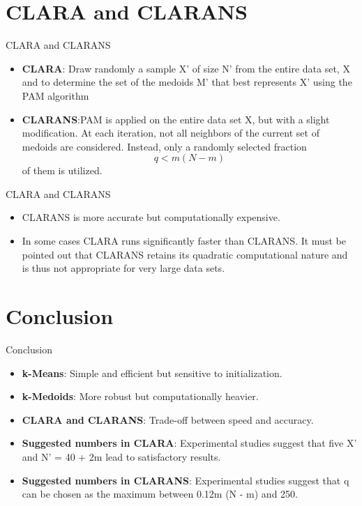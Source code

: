 \documentclass{beamer}
\begin{document}
\section{CLARA and CLARANS}
\begin{frame}{CLARA and CLARANS}
    \begin{itemize}
        \item \textbf{CLARA}: Draw randomly a sample X'
 of size N' from the entire data set, X and to determine the set of the medoids M' that best represents X' using the PAM algorithm
        \item \textbf{CLARANS}:PAM is applied on the entire data set X, but with a slight modification. At each iteration, not all neighbors of the current set of medoids are considered. Instead, only a randomly selected fraction 
        \[
        q < m(N - m)
        \]
        of them is utilized.
        
    \end{itemize}
\end{frame}
\begin{frame}{CLARA and CLARANS}
    \begin{itemize}
        \item CLARANS is more accurate but computationally expensive.
        \item In some cases CLARA runs significantly faster than CLARANS. It must be pointed out that CLARANS retains its quadratic computational nature and is thus not appropriate for very large data sets.
    \end{itemize}
\end{frame}

\section{Conclusion}
\begin{frame}{Conclusion}
    \begin{itemize}
        \item \textbf{k-Means}: Simple and efficient but sensitive to initialization.
        \item \textbf{k-Medoids}: More robust but computationally heavier.
        \item \textbf{CLARA and CLARANS}: Trade-off between speed and accuracy.
        \item \textbf{Suggested numbers in CLARA}: Experimental studies suggest that five X' and N' = 40 + 2m lead to satisfactory results.
        \item \textbf{Suggested numbers in CLARANS}: Experimental studies suggest that q can be chosen as the maximum between 0.12m (N - m) and 250.
    \end{itemize}
\end{frame}
\end{document}
